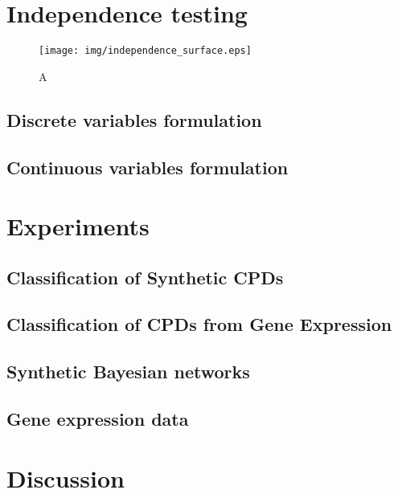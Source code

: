 \documentclass{article} %
\begin{document}
\cite{margaritis2003learning}

\section{Independence testing}

\begin{figure}[h]
\centering
\texttt{[image: img/independence\_surface.eps]}
\caption{A}
\end{figure}


\subsection{Discrete variables formulation}

\subsection{Continuous variables formulation}

\section{Experiments}

\subsection{Classification of Synthetic CPDs}

\subsection{Classification of CPDs from Gene Expression}

\subsection{Synthetic Bayesian networks}

\subsection{Gene expression data}

\section{Discussion}

\begin{small}

%
%

\end{small}

%
\end{document}
